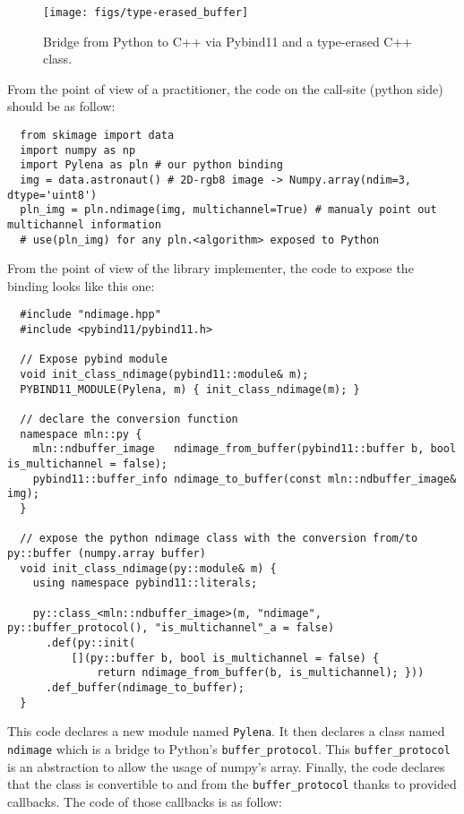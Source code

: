 \begin{figure}[htbp]
  \centering
  \texttt{[image: figs/type-erased\_buffer]}
  \caption{Bridge from Python to C++ via Pybind11 and a type-erased C++ class.}
  \label{fig:type-erased.buffer}
\end{figure}

From the point of view of a practitioner, the code on the call-site (python side) should be as follow:
\begin{verbatim}
  from skimage import data
  import numpy as np
  import Pylena as pln # our python binding
  img = data.astronaut() # 2D-rgb8 image -> Numpy.array(ndim=3, dtype='uint8')
  pln_img = pln.ndimage(img, multichannel=True) # manualy point out multichannel information
  # use(pln_img) for any pln.<algorithm> exposed to Python
\end{verbatim}

From the point of view of the library implementer, the code to expose the binding looks like this one:
\begin{verbatim}
  #include "ndimage.hpp"
  #include <pybind11/pybind11.h>

  // Expose pybind module
  void init_class_ndimage(pybind11::module& m);
  PYBIND11_MODULE(Pylena, m) { init_class_ndimage(m); }

  // declare the conversion function
  namespace mln::py {
    mln::ndbuffer_image   ndimage_from_buffer(pybind11::buffer b, bool is_multichannel = false);
    pybind11::buffer_info ndimage_to_buffer(const mln::ndbuffer_image& img);
  }

  // expose the python ndimage class with the conversion from/to py::buffer (numpy.array buffer)
  void init_class_ndimage(py::module& m) {
    using namespace pybind11::literals;

    py::class_<mln::ndbuffer_image>(m, "ndimage", py::buffer_protocol(), "is_multichannel"_a = false)
      .def(py::init(
          [](py::buffer b, bool is_multichannel = false) {
              return ndimage_from_buffer(b, is_multichannel); }))
      .def_buffer(ndimage_to_buffer);
  }
\end{verbatim}

This code declares a new module named \texttt{Pylena}. It then declares a class named \texttt{ndimage} which is a bridge
to Python's \texttt{buffer\_protocol}. This \texttt{buffer\_protocol} is an abstraction to allow the usage of numpy's
array. Finally, the code declares that the class is convertible to and from the \texttt{buffer\_protocol} thanks to
provided callbacks. The code of those callbacks is as follow:

